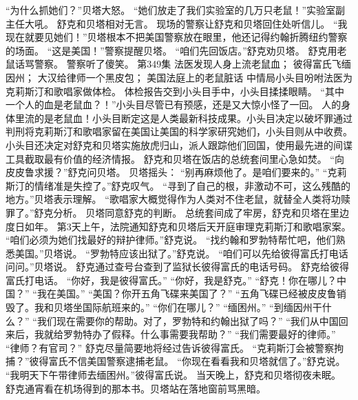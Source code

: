 \documentclass[a4paper,12pt,UTF8,twoside]{ctexbook}
\begin{document}
        “为什么抓她们？”贝塔大怒。  
        “她们放走了我们实验室的几万只老鼠！”实验室副主任大吼。  
        舒克和贝塔相对无言。  
        现场的警察让舒克和贝塔回住处听信儿。  
        “我现在就要见她们！”贝塔根本不把美国警察放在眼里，他还记得约翰折腾纽约警察的场面。  
        “这是美国！”警察提醒贝塔。  
        “咱们先回饭店。”舒克劝贝塔。  
        舒克用老鼠话骂警察。  
        警察听了傻笑。          第349集  
        法医发现人身上流老鼠血；  
        彼得富氏飞缅因州；  
        大汉给律师一个黑皮包；  
        美国法庭上的老鼠脏话    
        中情局小头目吩咐法医为克莉斯汀和歌唱家做体检。  
        体检报告交到小头目手中，小头目揉揉眼睛。  
        “其中一个人的血是老鼠血？！”小头目尽管已有预感，还是又大惊小怪了一回。  
        人的身体里流的是老鼠血！小头目断定这是人类最新科技成果。小头目决定以破坏罪通过判刑将克莉斯汀和歌唱家留在美国让美国的科学家研究她们，小头目则从中收费。  
        小头目还决定对舒克和贝塔实施放虎归山，派人跟踪他们回国，使用最先进的间谍工具截取最有价值的经济情报。  
        舒克和贝塔在饭店的总统套间里心急如焚。  
        “向皮皮鲁求援？”舒克问贝塔。  
        贝塔摇头：  
        “别再麻烦他了。是咱们要来的。”  
        “克莉斯汀的情绪准是失控了。”舒克叹气。  
        “寻到了自己的根，非激动不可，这么残酷的地方。”贝塔表示理解。  
        “歌唱家大概觉得作为人类对不住老鼠，就替全人类将功赎罪了。”舒克分析。  
        贝塔同意舒克的判断。  
        总统套间成了牢房，舒克和贝塔在里边度日如年。  
        第3天上午，法院通知舒克和贝塔后天开庭审理克莉斯汀和歌唱家案。  
        “咱们必须为她们找最好的辩护律师。”舒克说。  
        “找约翰和罗勃特帮忙吧，他们熟悉美国。”贝塔说。  
        “罗勃特应该出狱了。”舒克说。  
        “咱们可以先给彼得富氏打电话问问。”贝塔说。  
        舒克通过查号台查到了监狱长彼得富氏的电话号码。  
        舒克给彼得富氏打电话。  
        “你好，我是彼得富氏。”        
        “你好，我是舒克。”  
        “舒克！你在哪儿？中国？”  
        “我在美国。”  
        “美国？你开五角飞碟来美国了？”  
        “五角飞碟已经被皮皮鲁销毁了。我和贝塔坐国际航班来的。”  
        “你们在哪儿？”  
        “缅困州。”  
        “到缅因州干什么？”  
        “我们现在需要你的帮助。对了，罗勃特和约翰出狱了吗？”  
        “我们从中国回来后，我就给罗勃特办了假释。什么事需要我帮助？”  
        “我们需要最好的律师。”  
        “律师？有官司？”  
        舒克尽量简要地将经过告诉彼得富氏。  
        “克莉斯汀会被警察拘捕？”彼得富氏不信美国警察逮捕老鼠。  
        “你现在看看我和贝塔就信了。”舒克说。  
        “我明天下午带律师去缅困州。”彼得富氏说。  
        当天晚上，舒克和贝塔彻夜未眠。  
        舒克通宵看在机场得到的那本书。贝塔站在落地窗前骂黑暗。  
\end{document}
